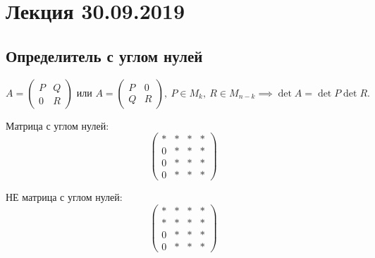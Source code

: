 \section{Лекция 30.09.2019}

\subsection{Определитель с углом нулей}

\begin{proposal}
    \begin{equation*}
        A = \left(
            \begin{array}{c|c}
                P & Q \\
                \hline
                0 & R
            \end{array}
        \right) \text{ или } A =
        \left(
            \begin{array}{c|c}
                P & 0 \\
                \hline
                Q & R
            \end{array}
        \right), \ P \in M_k, \ R \in M_{n-k} \implies \det A = \det P \det R
    .\end{equation*}
\end{proposal}

Матрица с углом нулей:
\begin{equation*}
    \left(
        \begin{array}{c|ccc}
            * & * & * & * \\
            \hline
            0 & * & * & * \\
            0 & * & * & * \\
            0 & * & * & *
        \end{array}
    \right)
\end{equation*}

НЕ матрица с углом нулей:
\begin{equation*}
    \left(
        \begin{array}{c|ccc}
            * & * & * & * \\
            * & * & * & * \\
            \hline
            0 & * & * & * \\
            0 & * & * & *
        \end{array}
    \right)
\end{equation*}

